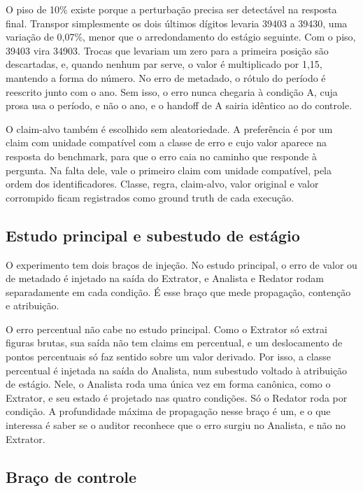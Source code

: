 O piso de 10\% existe porque a perturbação precisa ser detectável na resposta final.
Transpor simplesmente os dois últimos dígitos levaria 39403 a 39430, uma variação de 0,07\%, menor que o arredondamento do estágio seguinte. Com o piso, 39403 vira 34903.
Trocas que levariam um zero para a primeira posição são descartadas, e, quando nenhum par serve, o valor é multiplicado por 1,15, mantendo a forma do número.
No erro de metadado, o rótulo do período é reescrito junto com o ano.
Sem isso, o erro nunca chegaria à condição A, cuja prosa usa o período, e não o ano, e o handoff de A sairia idêntico ao do controle.

O claim-alvo também é escolhido sem aleatoriedade.
A preferência é por um claim com unidade compatível com a classe de erro e cujo valor aparece na resposta do benchmark, para que o erro caia no caminho que responde à pergunta.
Na falta dele, vale o primeiro claim com unidade compatível, pela ordem dos identificadores.
Classe, regra, claim-alvo, valor original e valor corrompido ficam registrados como ground truth de cada execução.

\subsection{Estudo principal e subestudo de estágio}\label{sec:estudos}

O experimento tem dois braços de injeção.
No estudo principal, o erro de valor ou de metadado é injetado na saída do Extrator, e Analista e Redator rodam separadamente em cada condição.
É esse braço que mede propagação, contenção e atribuição.

O erro percentual não cabe no estudo principal.
Como o Extrator só extrai figuras brutas, sua saída não tem claims em percentual, e um deslocamento de pontos percentuais só faz sentido sobre um valor derivado.
Por isso, a classe percentual é injetada na saída do Analista, num subestudo voltado à atribuição de estágio.
Nele, o Analista roda uma única vez em forma canônica, como o Extrator, e seu estado é projetado nas quatro condições. Só o Redator roda por condição.
A profundidade máxima de propagação nesse braço é um, e o que interessa é saber se o auditor reconhece que o erro surgiu no Analista, e não no Extrator.

\subsection{Braço de controle}\label{sec:controle}

